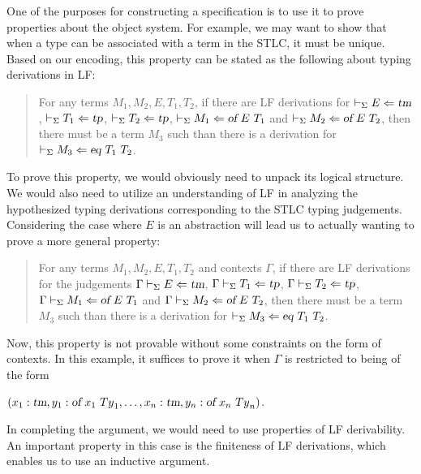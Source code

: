 One of the purposes for constructing a specification is to use it to
prove properties about the object system.
%
For example, we may want to show that when a type can be associated
with a term in the STLC, it must be unique.
%
Based on our encoding, this property can be stated as the following
about typing derivations in LF:
\begin{quotation}
\noindent For any terms $M_1,M_2,E,T_1,T_2$, if there are LF
derivations for
$\vdash_{\Sigma} E\Leftarrow \mbox{\sl tm}$, $\vdash_{\Sigma} T_1\Leftarrow \mbox{\sl tp}$,
$\vdash_{\Sigma} T_2\Leftarrow \mbox{\sl tp}$,
$\vdash_{\Sigma} M_1\Leftarrow \mbox{\sl of}\  E\  T_1$ and
$\vdash_{\Sigma} M_2\Leftarrow \mbox{\sl of}\  E\  T_2$, then there must be a term
$M_3$ such than there is a derivation for
$\vdash_{\Sigma} M_3\Leftarrow \mbox{\sl eq}\  T_1\  T_2$. 
\end{quotation}
To prove this property, we would obviously need to unpack its logical
structure.
%
We would also need to utilize an understanding of LF in
analyzing the hypothesized typing derivations corresponding to the
STLC typing judgements. 
%
Considering the case where $E$ is an abstraction will lead us to actually
wanting to prove a more general property:
\begin{quotation}
\noindent For any terms $M_1,M_2,E,T_1,T_2$ and contexts $\Gamma$, if
there are LF derivations for the judgements
$\Gamma \vdash_{\Sigma} E\Leftarrow \mbox{\sl tm}$, $\Gamma \vdash_{\Sigma} T_1\Leftarrow \mbox{\sl tp}$,
$\Gamma \vdash_{\Sigma} T_2\Leftarrow \mbox{\sl tp}$,
$\Gamma \vdash_{\Sigma} M_1\Leftarrow \mbox{\sl of}\  E\  T_1$ and
$\Gamma \vdash_{\Sigma} M_2\Leftarrow \mbox{\sl of}\  E\  T_2$, 
then there must be a term $M_3$ such than there is a derivation
for $\vdash_{\Sigma} M_3\Leftarrow \mbox{\sl eq}\  T_1\  T_2$. 
\end{quotation}
Now, this property is not provable without some constraints on the form
of contexts.
%
In this example, it suffices to prove it when $\Gamma$ is restricted
to being of the form
\begin{center}
 $(x_1:\mbox{\sl tm},y_1:\mbox{\sl of}\  x_1\ {Ty}_1,\ldots,x_n:\mbox{\sl tm},y_n:\mbox{\sl of}\  x_n\ {Ty}_n)$.
\end{center}
%
\noindent In completing the argument, we would need to use properties of LF
derivability.
%
An important property in this case is the finiteness of
LF derivations, which enables us to use an inductive argument.


